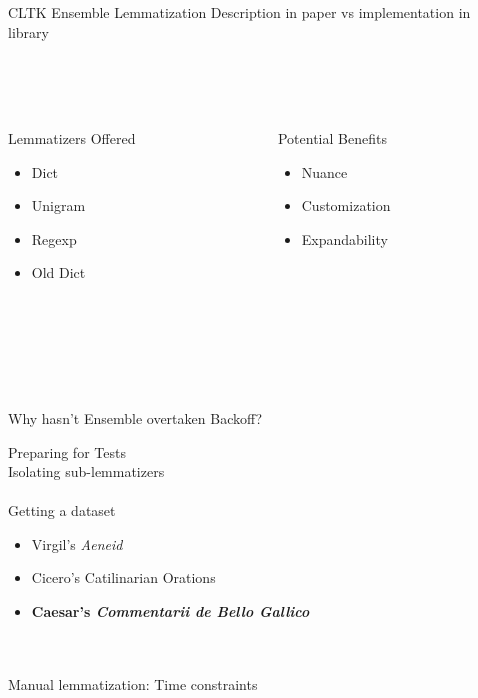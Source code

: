 \documentclass[aspectratio=169,xcolor=dvipsnames]{beamer}
\begin{document}
\begin{frame}[t]{CLTK Ensemble Lemmatization}
    Description in paper vs implementation in library \\ \ \\ \ \\ \ \\
    \begin{columns}
        \begin{column}{0.5\textwidth}
            {\large Lemmatizers Offered}\\
            \begin{itemize}
                \item Dict
                \item Unigram
                \item Regexp
                \item Old Dict
            \end{itemize}
        \end{column}
        \begin{column}{0.5\textwidth}
                {\large Potential Benefits}\\
                \begin{itemize}
                    \item Nuance
                    \item Customization
                    \item Expandability
                \end{itemize}
        \end{column}
    \end{columns} 
\ \\ \ \\ \ \\ \ \\ \ \\
{\Large Why hasn't Ensemble overtaken Backoff?}
\end{frame}

\begin{frame}[t]{Preparing for Tests}
\ \\
    Isolating sub-lemmatizers \\ \ \\

    Getting a dataset
    \begin{itemize}
        \item Virgil's \textit{Aeneid}
        \item Cicero's Catilinarian Orations
        \item \textbf{Caesar's \textit{Commentarii de Bello Gallico}}
    \end{itemize}
 \ \\ \ \\
    Manual lemmatization: Time constraints
\end{frame}
\end{document}
